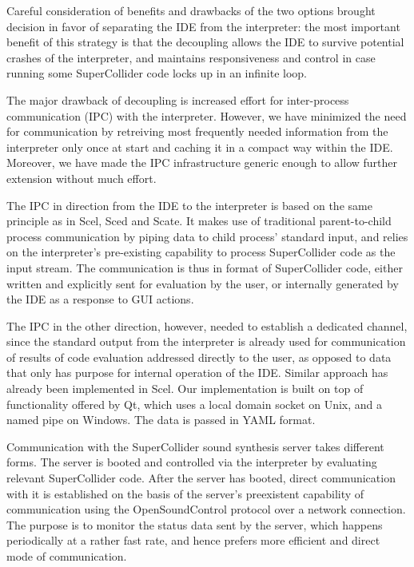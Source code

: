\documentclass[11pt,a4paper]{article}
\begin{document}
Careful consideration of benefits and drawbacks of the two options brought decision in favor of
separating the IDE from the interpreter: the most important benefit of this strategy is that the
decoupling allows the IDE to survive potential crashes of the interpreter, and maintains
responsiveness and control in case running some SuperCollider code locks up in an infinite loop.

The major drawback of decoupling is increased effort for inter-process communication (IPC) with the
interpreter. However, we have minimized the need for communication by retreiving most frequently
needed information from the interpreter only once at start and caching it in a compact way within
the IDE. Moreover, we have made the IPC infrastructure generic enough to allow further extension
without much effort.

The IPC in direction from the IDE to the interpreter is based on the same principle as in Scel,
Sced and Scate. It makes use of traditional parent-to-child process communication by piping data to
child process' standard input, and relies on the interpreter's pre-existing capability to
process SuperCollider code as the input stream. The communication is thus in format of SuperCollider
code, either written and explicitly sent for evaluation by the user, or internally generated by
the IDE as a response to GUI actions.

The IPC in the other direction, however, needed to establish a dedicated channel, since the standard
output from the interpreter is already used for communication of results of code evaluation
addressed directly to the user, as opposed to data that only has purpose for internal operation of
the IDE. Similar approach has already been implemented in Scel. Our implementation is built on top
of functionality offered by Qt, which uses a local domain socket on Unix, and a named pipe on
Windows. The data is passed in YAML format.

Communication with the SuperCollider sound synthesis server takes different forms. The server is
booted and controlled via the interpreter by evaluating relevant SuperCollider code. After the
server has booted, direct communication with it is established on the basis of the server's
preexistent capability of communication using the OpenSoundControl protocol over a network
connection. The purpose is to monitor the status data sent by the server, which happens periodically
at a rather fast rate, and hence prefers more efficient and direct mode of communication.
\end{document}
